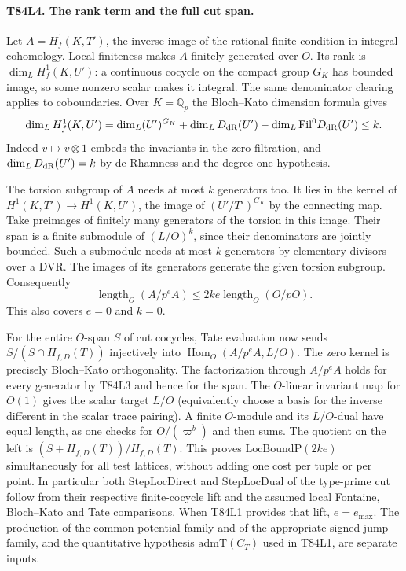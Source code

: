 \paragraph{T84L4. The rank term and the full cut span.}
Let $A=H^1_f(K,T')$, the inverse image of the rational finite
condition in integral cohomology. Local finiteness makes $A$
finitely generated over $O$. Its rank is $\dim_L H^1_f(K,U')$:
a continuous cocycle on the compact group $G_K$ has bounded
image, so some nonzero scalar makes it integral. The same
denominator clearing applies to coboundaries. Over
$K=\mathbb Q_p$ the Bloch--Kato dimension formula gives
\[
 \dim_L H^1_f(K,U')
 =\dim_L (U')^{G_K}+\dim_L D_{\rm dR}(U')
                         -\dim_L {\rm Fil}^0D_{\rm dR}(U')\le k .
\]
Indeed $v\mapsto v\otimes1$ embeds the invariants in the
zero filtration, and $\dim_L D_{\rm dR}(U')=k$ by de Rhamness
and the degree-one hypothesis.

The torsion subgroup of $A$ needs at most $k$ generators too.
It lies in the kernel of $H^1(K,T')\to H^1(K,U')$, the image
of $(U'/T')^{G_K}$ by the connecting map. Take preimages of
finitely many generators of the torsion in this image. Their
span is a finite submodule of $(L/O)^k$, since their
denominators are jointly bounded. Such a submodule needs at
most $k$ generators by elementary divisors over a DVR. The
images of its generators generate the given torsion subgroup.
Consequently
\[
   \operatorname{length}_O(A/p^e A)\le
                2ke\operatorname{length}_O(O/pO).
\]
This also covers $e=0$ and $k=0$.

For the entire $O$-span $S$ of cut cocycles, Tate evaluation
now sends $S/(S\cap H_{f,D}(T))$ injectively into
$\operatorname{Hom}_O(A/p^e A,L/O)$. The zero kernel is precisely
Bloch--Kato orthogonality. The factorization through $A/p^e A$
holds for every generator by T84L3 and hence for the span.
The $O$-linear invariant map for $O(1)$ gives the scalar target
$L/O$ (equivalently choose a basis for the inverse different
in the scalar trace pairing). A finite $O$-module and its
$L/O$-dual have equal length, as one checks for $O/(\varpi^b)$
and then sums. The quotient on the left is
$(S+H_{f,D}(T))/H_{f,D}(T)$. This proves
$\mathrm{LocBoundP}(2ke)$ simultaneously for all test
lattices, without adding one cost per tuple or per point.
In particular both $\mathrm{StepLocDirect}$ and
$\mathrm{StepLocDual}$ of the type-prime cut follow from their
respective finite-cocycle lift and the assumed local
Fontaine, Bloch--Kato and Tate comparisons. When T84L1
provides that lift, $e=e_{\max}$. The production of the common
potential family and of the appropriate signed jump family,
and the quantitative hypothesis $\mathrm{admT}(C_T)$ used in
T84L1, are separate inputs.

